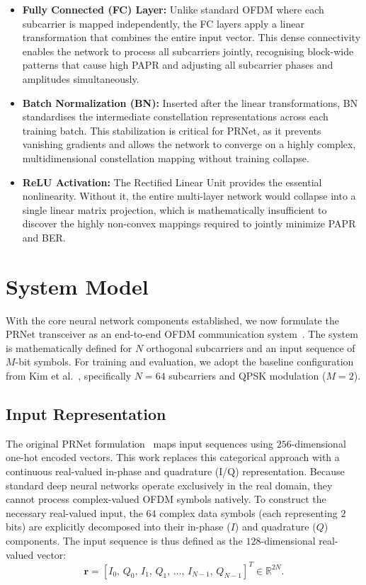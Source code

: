 \begin{itemize}
    \item \textbf{Fully Connected (FC) Layer:} Unlike standard OFDM where each subcarrier is mapped independently, the FC layers apply a linear transformation that combines the entire input vector. This dense connectivity enables the network to process all subcarriers jointly, recognising block-wide patterns that cause high PAPR and adjusting all subcarrier phases and amplitudes simultaneously.
    \item \textbf{Batch Normalization (BN):} Inserted after the linear transformations, BN standardises the intermediate constellation representations across each training batch. This stabilization is critical for PRNet, as it prevents vanishing gradients and allows the network to converge on a highly complex, multidimensional constellation mapping without training collapse.
    \item \textbf{ReLU Activation:} The Rectified Linear Unit provides the essential nonlinearity. Without it, the entire multi-layer network would collapse into a single linear matrix projection, which is mathematically insufficient to discover the highly non-convex mappings required to jointly minimize PAPR and BER.
\end{itemize}

\section{System Model}
\label{sec:system_model}

With the core neural network components established, we now formulate the PRNet transceiver as an end-to-end OFDM communication system~\cite{kim2017novel}. The system is mathematically defined for $N$ orthogonal subcarriers and an input sequence of $M$-bit symbols. For training and evaluation, we adopt the baseline configuration from Kim et al.~\cite{kim2017novel}, specifically $N = 64$ subcarriers and QPSK modulation ($M = 2$).

\subsection{Input Representation}

The original PRNet formulation~\cite{kim2017novel} maps input sequences using $256$-dimensional one-hot encoded vectors. This work replaces this categorical approach with a continuous real-valued in-phase and quadrature (I/Q) representation. Because standard deep neural networks operate exclusively in the real domain, they cannot process complex-valued OFDM symbols natively. To construct the necessary real-valued input, the $64$ complex data symbols (each representing $2$ bits) are explicitly decomposed into their in-phase ($I$) and quadrature ($Q$) components. The input sequence is thus defined as the $128$-dimensional real-valued vector:
\begin{equation*}
    \bm{r} = [I_0,\, Q_0,\, I_1,\, Q_1,\, \dots,\, I_{N-1},\, Q_{N-1}]^T \in \mathbb{R}^{2N}.
\end{equation*}

